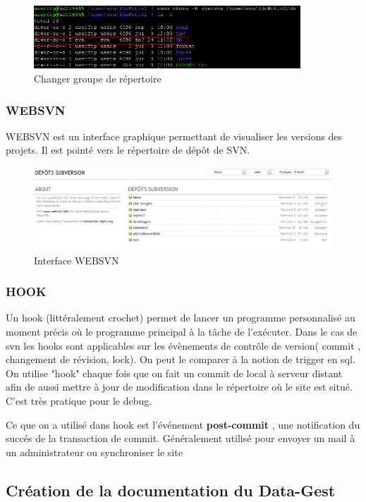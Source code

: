\begin{figure}[hbtp]
\centering
\includegraphics[width=10cm]{body/images/svn-problem-permission.png}
\caption{Changer groupe de répertoire}
\end{figure}

\subsubsection{WEBSVN}
WEBSVN est un interface graphique permettant de visualiser les versions des projets. Il est pointé vers le répertoire de dépôt de SVN.
\begin{figure}[hbtp]
\centering
\includegraphics[width=15cm]{body/images/websvn.png}
\caption{Interface WEBSVN}
\end{figure}


\subsubsection{HOOK}
Un hook (littéralement crochet) permet de lancer un programme personnalisé au moment précis où le programme principal à la tâche de l’exécuter. Dans le cas de svn les hooks sont applicables sur les évènements de contrôle de version( commit , changement de révision, lock). On peut le comparer à la notion de trigger en sql.
On utilise "hook" chaque fois que on fait un commit de local à serveur distant afin de aussi mettre à jour de modification dans le répertoire où le site est situé. C'est très pratique pour le debug.

Ce que on a utilisé dans hook est l'événement \textbf{post-commit} , une notification du succés de la transaction de commit. Généralement utilisé pour envoyer un mail à un administrateur ou synchroniser le site 


\subsection{Création de la documentation du Data-Gest}
